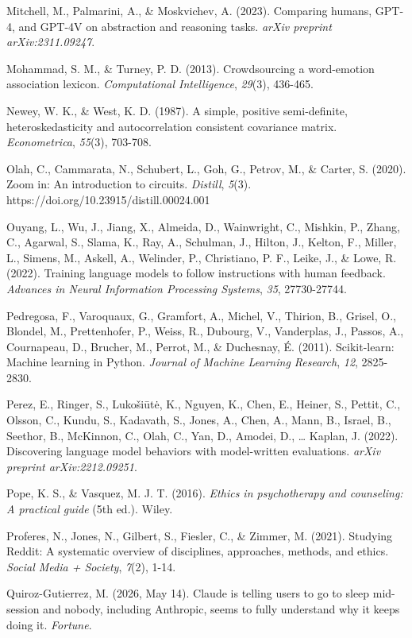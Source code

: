 \documentclass[11pt]{article}
\begin{document}
Mitchell, M., Palmarini, A., \& Moskvichev, A. (2023). Comparing humans, GPT-4, and GPT-4V on abstraction and reasoning tasks. \emph{arXiv preprint arXiv:2311.09247}.

Mohammad, S. M., \& Turney, P. D. (2013). Crowdsourcing a word-emotion association lexicon. \emph{Computational Intelligence}, \emph{29}(3), 436-465.

Newey, W. K., \& West, K. D. (1987). A simple, positive semi-definite, heteroskedasticity and autocorrelation consistent covariance matrix. \emph{Econometrica}, \emph{55}(3), 703-708.

Olah, C., Cammarata, N., Schubert, L., Goh, G., Petrov, M., \& Carter, S. (2020). Zoom in: An introduction to circuits. \emph{Distill}, \emph{5}(3). https://doi.org/10.23915/distill.00024.001

Ouyang, L., Wu, J., Jiang, X., Almeida, D., Wainwright, C., Mishkin, P., Zhang, C., Agarwal, S., Slama, K., Ray, A., Schulman, J., Hilton, J., Kelton, F., Miller, L., Simens, M., Askell, A., Welinder, P., Christiano, P. F., Leike, J., \& Lowe, R. (2022). Training language models to follow instructions with human feedback. \emph{Advances in Neural Information Processing Systems}, \emph{35}, 27730-27744.

Pedregosa, F., Varoquaux, G., Gramfort, A., Michel, V., Thirion, B., Grisel, O., Blondel, M., Prettenhofer, P., Weiss, R., Dubourg, V., Vanderplas, J., Passos, A., Cournapeau, D., Brucher, M., Perrot, M., \& Duchesnay, É. (2011). Scikit-learn: Machine learning in Python. \emph{Journal of Machine Learning Research}, \emph{12}, 2825-2830.

Perez, E., Ringer, S., Lukošiūtė, K., Nguyen, K., Chen, E., Heiner, S., Pettit, C., Olsson, C., Kundu, S., Kadavath, S., Jones, A., Chen, A., Mann, B., Israel, B., Seethor, B., McKinnon, C., Olah, C., Yan, D., Amodei, D., \ldots{} Kaplan, J. (2022). Discovering language model behaviors with model-written evaluations. \emph{arXiv preprint arXiv:2212.09251}.

Pope, K. S., \& Vasquez, M. J. T. (2016). \emph{Ethics in psychotherapy and counseling: A practical guide} (5th ed.). Wiley.

Proferes, N., Jones, N., Gilbert, S., Fiesler, C., \& Zimmer, M. (2021). Studying Reddit: A systematic overview of disciplines, approaches, methods, and ethics. \emph{Social Media + Society}, \emph{7}(2), 1-14.

Quiroz-Gutierrez, M. (2026, May 14). Claude is telling users to go to sleep mid-session and nobody, including Anthropic, seems to fully understand why it keeps doing it. \emph{Fortune}.
\end{document}
